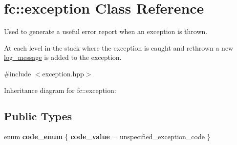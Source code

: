 \hypertarget{classfc_1_1exception}{}\section{fc\+:\+:exception Class Reference}
\label{classfc_1_1exception}


Used to generate a useful error report when an exception is thrown.

At each level in the stack where the exception is caught and rethrown a new \mbox{\hyperlink{classfc_1_1log__message}{log\+\_\+message}} is added to the exception.  




{\ttfamily \#include $<$exception.\+hpp$>$}



Inheritance diagram for fc\+:\+:exception\+:
\subsection*{Public Types}
\begin{DoxyCompactItemize}
\item 
\mbox{\label{classfc_1_1exception_a2635b9fb22bb7f1471b8353463ef9b66}} 
enum {\bfseries code\+\_\+enum} \{ {\bfseries code\+\_\+value} = unspecified\+\_\+exception\+\_\+code
 \}
\end{DoxyCompactItemize}
